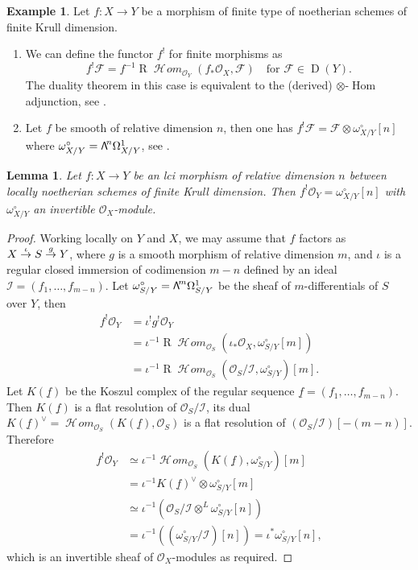 \documentclass[JEP,XML,SOM,Unicode,published]{cedram}
\newcommand\bw[1]{\mathbin{\hbox{$\mathsf{\Lambda}$}^{\!#1}}}
\newcommand\To[1]{\mathchoice{\xrightarrow{\textstyle\kern4pt#1\kern3pt}}{\stackrel{#1}{\to}}{}{}}
\numberwithin{equation}{section}
\newtheorem{lem}[prop]{Lemma}
\theoremstyle{definition}
\newtheorem{exam}[prop]{Example}
\newcommand{\n}[1]{\mathcal{#1}}
\newcommand{\s}[1]{\mathscr{#1}}
\DeclareMathOperator{\R}{R}
\DeclareMathOperator{\D}{D}
\DeclareMathOperator{\Hom}{Hom}
\DeclareMathOperator{\sHom}{\s{H}\!\mathit{om}}
\begin{document}
\begin{exam}
\label{ExampleDualizingSheaf}
Let $f:X\to Y$ be a morphism of finite type of noetherian schemes of finite Krull dimension.
\begin{enumerate}
\item\label{ExampleDualizingSheaf1} We can define the functor $f^!$ for finite morphisms as
\[
f^!\n{F}=f^{-1} \R \sHom_{\n{O}_Y}(f_*\s{O}_X, \n{F}) \quad\text{for } \n{F}\in \D(Y).
\]
The duality theorem in this case is equivalent to the (derived) $\otimes$-$\Hom$ adjunction, see \cite[\S III.6]{hartshorne1966residues}.

\item\label{ExampleDualizingSheaf2} Let $f$ be smooth of relative dimension $n$, then one has $f^!\n{F}=\n{F}\otimes \omega_{X/Y}^{\circ}[n]$ where $\omega_{X/Y}^{\circ}=\bw{n} \Omega^1_{X/Y}$, see \cite[\S III.2]{hartshorne1966residues}.
\end{enumerate}
\end{exam}

\begin{lem}
\label{fOy}
Let $f: X\to Y$ be an lci morphism of relative dimension $n$ between locally noetherian schemes of finite Krull dimension. Then $f^!\s{O}_Y = \omega^{\circ}_{X/Y}[n]$ with $\omega^{\circ}_{X/Y}$ an invertible $\s{O}_X$-module.
\end{lem}

\begin{proof}
Working locally on $Y$ and $X$, we may assume that $f$ factors as $X \To{\iota} S \To{g} Y$, where $g$ is a smooth morphism of relative dimension $m$, and $\iota$ is a regular closed immersion of codimension $m-n$ defined by an ideal $\s{I}=(f_1,\ldots, f_{m-n})$. Let $\omega^{\circ}_{S/Y}=\bw{m}\Omega^{1}_{S/Y}$ be the sheaf of $m$-differentials of $S$ over $Y$, then
\begin{align*}
f^!\s{O}_Y & = \iota^! g^! \s{O}_Y \\
		 & = \iota^{-1} \R \sHom_{\s{O}_S}(\iota_* \s{O}_X, \omega_{S/Y}^\circ[m]) \\
		 & = \iota^{-1} \R \sHom_{\s{O}_S}(\s{O}_S/\s{I}, \omega_{S/Y}^\circ)[m].
\end{align*}
Let $K(\underline{f})$ be the Koszul complex of the regular sequence $\underline{f}=(f_1,\ldots, f_{m-n})$. Then $K(\underline{f})$ is a flat resolution of $\s{O}_S/\s{I}$, its dual $K(\underline{f})^\vee=\sHom_{\s{O}_S}(K(\underline{f}), \s{O}_S)$ is a flat resolution of \mbox{\((\s{O}_S/\s{I})[-(m-n)]\)}. Therefore
\begin{align*}
f^!\s{O}_Y & \simeq \iota^{-1} \sHom_{\s{O}_S}(K(\underline{f}), \omega^\circ_{S/Y})[m] \\
		 & = \iota^{-1} K(\underline{f})^\vee \otimes \omega^\circ_{S/Y} [m] \\
		 & \simeq \iota^{-1}(\s{O}_{S}/\s{I}\otimes ^L \omega^\circ_{S/Y}[n]) \\
		 & = \iota^{-1}((\omega^\circ_{S/Y}/\s{I})[n]) = \iota^* \omega^{\circ}_{S/Y}[n],
\end{align*}
which is an invertible sheaf of $\s{O}_X$-modules as required.
\end{proof}
\end{document}
